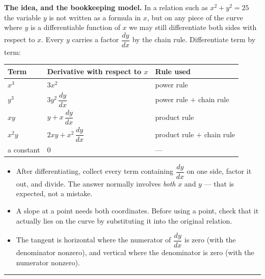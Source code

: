 \documentclass[12pt]{article}
\begin{document}

\noindent\textbf{The idea, and the bookkeeping model.} In a relation such as
$x^{2} + y^{2} = 25$ the variable $y$ is not written as a formula in $x$, but on
any piece of the curve where $y$ is a differentiable function of $x$ we may still
differentiate both sides with respect to $x$. Every $y$ carries a factor
$\dfrac{dy}{dx}$ by the chain rule. Differentiate term by term:

\begin{center}\small
\begin{tabular}{|l|l|l|}\hline
\textbf{Term} & \textbf{Derivative with respect to }$x$ & \textbf{Rule used}\\\hline
$x^{3}$ & $3x^{2}$ & power rule\\\hline
$y^{3}$ & $3y^{2}\,\dfrac{dy}{dx}$ & power rule $+$ chain rule\\\hline
$xy$ & $y + x\,\dfrac{dy}{dx}$ & product rule\\\hline
$x^{2}y$ & $2xy + x^{2}\,\dfrac{dy}{dx}$ & product rule $+$ chain rule\\\hline
a constant & $0$ & ---\\\hline
\end{tabular}
\end{center}

\begin{itemize}[leftmargin=0.9cm, itemsep=1pt, topsep=3pt]
  \item After differentiating, collect every term containing $\dfrac{dy}{dx}$ on
        one side, factor it out, and divide. The answer normally involves
        \emph{both} $x$ and $y$ --- that is expected, not a mistake.
  \item A slope at a point needs both coordinates. Before using a point, check
        that it actually lies on the curve by substituting it into the original
        relation.
  \item The tangent is horizontal where the numerator of $\dfrac{dy}{dx}$ is zero
        (with the denominator nonzero), and vertical where the denominator is zero
        (with the numerator nonzero).
\end{itemize}
\vspace{0.1cm}
\noindent\rule{\linewidth}{0.4pt}

\end{document}

